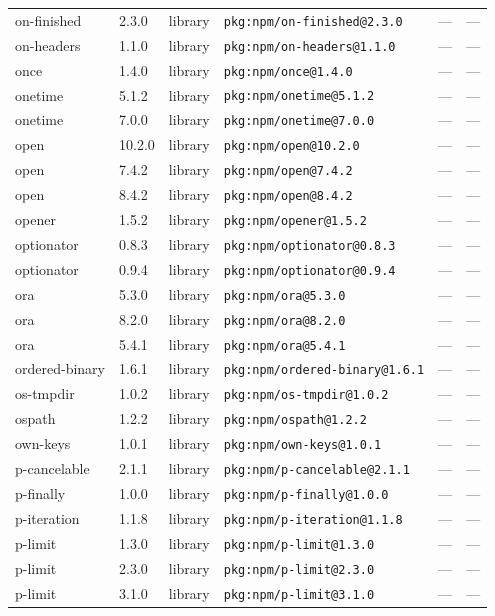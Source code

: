 \documentclass[11pt]{article}
\begin{document}
\begin{longtable}{|l|l|l|p{2.2cm}|l|p{4cm}|}
on-finished & 2.3.0 & library & \texttt{pkg:npm/on-finished@2.3.0} & — & — \\
on-headers & 1.1.0 & library & \texttt{pkg:npm/on-headers@1.1.0} & — & — \\
once & 1.4.0 & library & \texttt{pkg:npm/once@1.4.0} & — & — \\
onetime & 5.1.2 & library & \texttt{pkg:npm/onetime@5.1.2} & — & — \\
onetime & 7.0.0 & library & \texttt{pkg:npm/onetime@7.0.0} & — & — \\
open & 10.2.0 & library & \texttt{pkg:npm/open@10.2.0} & — & — \\
open & 7.4.2 & library & \texttt{pkg:npm/open@7.4.2} & — & — \\
open & 8.4.2 & library & \texttt{pkg:npm/open@8.4.2} & — & — \\
opener & 1.5.2 & library & \texttt{pkg:npm/opener@1.5.2} & — & — \\
optionator & 0.8.3 & library & \texttt{pkg:npm/optionator@0.8.3} & — & — \\
optionator & 0.9.4 & library & \texttt{pkg:npm/optionator@0.9.4} & — & — \\
ora & 5.3.0 & library & \texttt{pkg:npm/ora@5.3.0} & — & — \\
ora & 8.2.0 & library & \texttt{pkg:npm/ora@8.2.0} & — & — \\
ora & 5.4.1 & library & \texttt{pkg:npm/ora@5.4.1} & — & — \\
ordered-binary & 1.6.1 & library & \texttt{pkg:npm/ordered-binary@1.6.1} & — & — \\
os-tmpdir & 1.0.2 & library & \texttt{pkg:npm/os-tmpdir@1.0.2} & — & — \\
ospath & 1.2.2 & library & \texttt{pkg:npm/ospath@1.2.2} & — & — \\
own-keys & 1.0.1 & library & \texttt{pkg:npm/own-keys@1.0.1} & — & — \\
p-cancelable & 2.1.1 & library & \texttt{pkg:npm/p-cancelable@2.1.1} & — & — \\
p-finally & 1.0.0 & library & \texttt{pkg:npm/p-finally@1.0.0} & — & — \\
p-iteration & 1.1.8 & library & \texttt{pkg:npm/p-iteration@1.1.8} & — & — \\
p-limit & 1.3.0 & library & \texttt{pkg:npm/p-limit@1.3.0} & — & — \\
p-limit & 2.3.0 & library & \texttt{pkg:npm/p-limit@2.3.0} & — & — \\
p-limit & 3.1.0 & library & \texttt{pkg:npm/p-limit@3.1.0} & — & — \\

\end{longtable}
\end{document}
